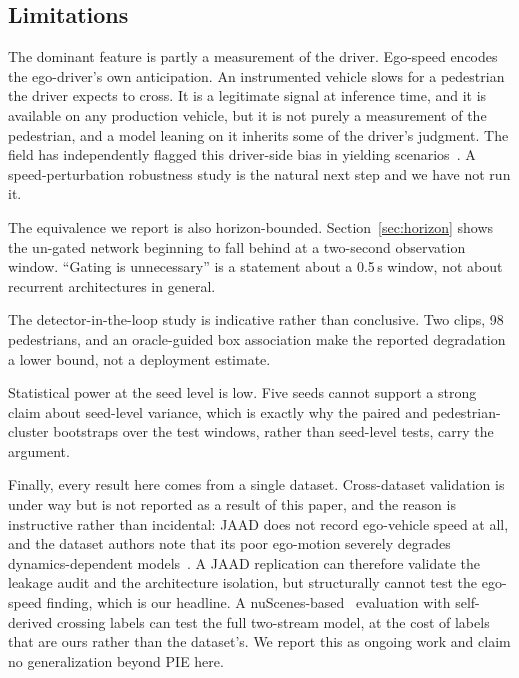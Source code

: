 \documentclass[mti,article,submit,moreauthors]{Definitions/mdpi}
\begin{document}
\subsection{Limitations}
\label{sec:limitations}

The dominant feature is partly a measurement of the driver. Ego-speed encodes the ego-driver's own anticipation. An instrumented vehicle slows for a pedestrian the driver expects to cross. It is a legitimate signal at inference time, and it is available on any production vehicle, but it is not purely a measurement of the pedestrian, and a model leaning on it inherits some of the driver's judgment. The field has independently flagged this driver-side bias in yielding scenarios~\citep{azarmi2024featureimportance}. A speed-perturbation robustness study is the natural next step and we have not run it.

The equivalence we report is also horizon-bounded. Section~\ref{sec:horizon} shows the un-gated network beginning to fall behind at a two-second observation window. ``Gating is unnecessary'' is a statement about a 0.5\,s window, not about recurrent architectures in general.

The detector-in-the-loop study is indicative rather than conclusive. Two clips, 98 pedestrians, and an oracle-guided box association make the reported degradation a lower bound, not a deployment estimate.

Statistical power at the seed level is low. Five seeds cannot support a strong claim about seed-level variance, which is exactly why the paired and pedestrian-cluster bootstraps over the test windows, rather than seed-level tests, carry the argument.

Finally, every result here comes from a single dataset. Cross-dataset validation is under way but is not reported as a result of this paper, and the reason is instructive rather than incidental: JAAD does not record ego-vehicle speed at all, and the dataset authors note that its poor ego-motion severely degrades dynamics-dependent models~\citep{rasouli2024diving}. A JAAD replication can therefore validate the leakage audit and the architecture isolation, but structurally cannot test the ego-speed finding, which is our headline. A nuScenes-based~\citep{caesar2020nuscenes} evaluation with self-derived crossing labels can test the full two-stream model, at the cost of labels that are ours rather than the dataset's. We report this as ongoing work and claim no generalization beyond PIE here.

\end{document}
